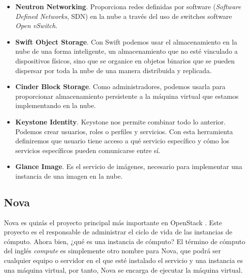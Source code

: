 \begin{itemize}
\item \textbf{Neutron Networking}. Proporciona redes definidas por software (\textit{Software Defined Networks}, SDN) en la nube a través del uso de switches software \textit{Open vSwitch}.
\end{itemize}

\begin{itemize}
\item \textbf{Swift Object Storage}. Con Swift podemos usar el almacenamiento en la nube de una forma inteligente, un almacenamiento que no esté vinculado a dispositivos físicos, sino que se organice en objetos binarios que se pueden dispersar por toda la nube de una manera distribuida y replicada.
\end{itemize}

\begin{itemize}
\item \textbf{Cinder Block Storage}. Como administradores, podemos usarla para proporcionar almacenamiento persistente a la máquina virtual que estamos implementando en la nube.
\end{itemize}

\begin{itemize}
\item\textbf{Keystone Identity}. Keystone nos permite combinar todo lo anterior. Podemos crear usuarios, roles o perfiles y servicios. Con esta herramienta definiremos que usuario tiene acceso a qué servicio específico y cómo los servicios específicos pueden comunicarse entre sí.
\end{itemize}

\begin{itemize}
\item \textbf{Glance Image}. Es el servicio de imágenes, necesario para implementar una instancia de una imagen en la nube. 
\end{itemize}

\subsection{Nova}
Nova es quizás el proyecto principal más importante en OpenStack \cite{noauthor_nova_nodate}. Este proyecto es el responsable de administrar el ciclo de vida de las instancias de cómputo. Ahora bien, ¿qué es una instancia de cómputo? El término de cómputo del inglés \textit{compute} es simplemente otro nombre para Nova, que podrá ser cualquier equipo o servidor en el que esté instalado el servicio y una instancia es una máquina virtual, por tanto, Nova se encarga de ejecutar la máquina virtual. 

